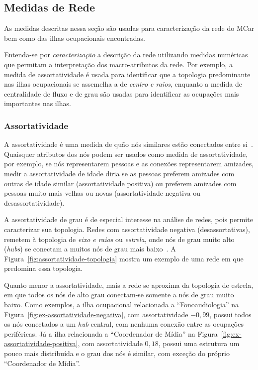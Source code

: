 \documentclass[12pt,a4paper]{article}
\begin{document}
\subsection{Medidas de Rede} \label{sec:medidas-de-rede}

As medidas descritas nessa seção são usadas para caracterização da rede do MCar bem como das ilhas ocupacionais encontradas.

Entenda-se por \textit{caracterização} a descrição da rede utilizando medidas numéricas que permitam a interpretação dos macro-atributos da rede. Por exemplo, a medida de assortatividade é usada para identificar que a topologia predominante nas ilhas ocupacionais se assemelha a de \textit{centro e raios}, enquanto a medida de centralidade de fluxo e de grau são usadas para identificar as ocupações mais importantes nas ilhas.

\subsubsection{Assortatividade} \label{sec:assortatividade}

A assortatividade é uma medida de quão nós similares estão conectados entre si~\cite{Newman2003-jn}. Quaisquer atributos dos nós podem ser usados como medida de assortatividade, por exemplo, se nós representarem pessoas e as conexões representarem amizades, medir a assortatividade de idade diria se as pessoas preferem amizades com outras de idade similar (assortatividade positiva) ou preferem amizades com pessoas muito mais velhas ou novas (assortatividade negativa ou desassortatividade).

A assortatividade de grau é de especial interesse na análise de redes, pois permite caracterizar sua topologia. Redes com assortatividade negativa (desassortativas), remetem à topologia de \textit{eixo e raios} ou \textit{estrela}, onde nós de grau muito alto (\textit{hubs}) se conectam a muitos nós de grau mais baixo~\cite{Barabasi2016-rn}. A Figura~\ref{fig:assortatividade-topologia} mostra um exemplo de uma rede em que predomina essa topologia.

Quanto menor a assortatividade, mais a rede se aproxima da topologia de estrela, em que todos os nós de alto grau conectam-se somente a nós de grau muito baixo. Como exemplos, a ilha ocupacional relacionada a \enquote{Fonoaudiologia} na Figura~\ref{fig:ex-assortatividade-negativa}, com assortatividade $-0,99$, possui todos os nós conectados a um \textit{hub} central, com nenhuma conexão entre as ocupações periféricas. Já a ilha relacionada a \enquote{Coordenador de Mídia} na Figura~\ref{fig:ex-assortatividade-positiva}, com assortatividade $0,18$, possui uma estrutura um pouco mais distribuída e o grau dos nós é similar, com exceção do próprio \enquote{Coordenador de Mídia}.
\end{document}
